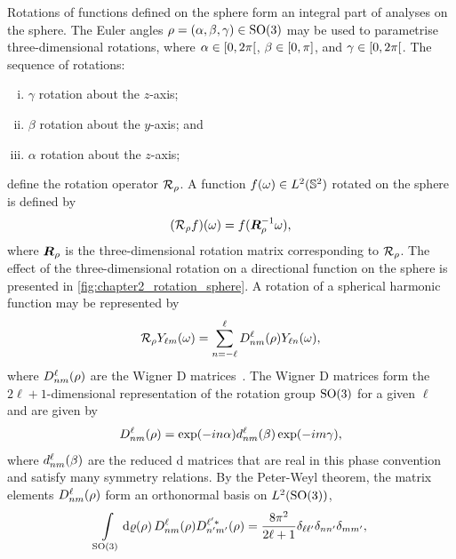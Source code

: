 Rotations of functions defined on the sphere form an integral part of analyses on the sphere.
The Euler angles \(\rho=(\alpha,\beta,\gamma) \in \rotationGroup{}\) may be used to parametrise three-dimensional rotations, where \(\alpha \in \interval[open right]{0}{2\pi}\), \(\beta \in \interval{0}{\pi}\), and \(\gamma \in \interval[open right]{0}{2\pi}\).
The sequence of rotations:
%
\begin{enumerate}[(i),nosep,left=\parindent]
	\item \({\gamma}\) rotation about the \(z\)-axis;
	\item \({\beta}\) rotation about the \(y\)-axis; and
	\item \({\alpha}\) rotation about the \(z\)-axis;
\end{enumerate}
%
define the rotation operator \(\rotation{\rho}\).
A function \(\pixel{f} \in \hilbert{\twoSphere}\) rotated on the sphere is defined by
%
\begin{equation}\label{eq:chapter2_rotation_matrix}
	\pixel{(\rotation{\rho}f)}
	= f(\rotationMatrix^{-1} \omega),
\end{equation}
%
where \(\rotationMatrix{}\) is the three-dimensional rotation matrix corresponding to \(\rotation{\rho}\).
The effect of the three-dimensional rotation on a directional function on the sphere is presented in \cref{fig:chapter2_rotation_sphere}.
A rotation of a spherical harmonic function may be represented by
%
\begin{equation}\label{eq:chapter2_rotate_spherical_harmonics}
	\rotation{\rho} \pixel{\harmonic{Y}}
	= \wignerSum \wigner{\ell}{n}{m}(\rho) \pixel{Y_{\ell n}},
\end{equation}
%
where \(\wigner{\ell}{n}{m}(\rho)\) are the Wigner D matrices~\cite{Brink1993,Ritchie1999}.
The Wigner D matrices form the \(2\ell+1\)-dimensional representation of the rotation group \(\rotationGroup{}\) for a given \(\ell{}\) and are given by
%
\begin{equation}
	\wigner{\ell}{n}{m}(\rho)
	= \exp(-i n\alpha) \reducedWigner{\ell}{n}{m}(\beta) \exp(-i m\gamma),
\end{equation}
%
where \(\reducedWigner{\ell}{n}{m}(\beta)\) are the reduced d matrices that are real in this phase convention and satisfy many symmetry relations.
By the Peter-Weyl theorem, the matrix elements \(\wigner{\ell}{n}{m}(\rho)\) form an orthonormal basis on \(\hilbert{\rotationGroup}\), \ie{}
%
\begin{equation}
	\integrateRotation{\rho} \wigner{\ell}{n}{m}(\rho) \wigner[\ast]{\ell'}{n'}{m'}(\rho)
	= \frac{8\pi^{2}}{2\ell+1} \delta_{\ell\ell'} \delta_{n n'} \delta_{mm'},
\end{equation}
